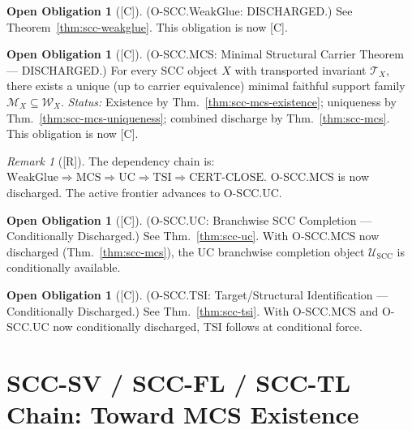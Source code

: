 \documentclass[12pt,oneside]{amsbook}
\theoremstyle{plain}
\theoremstyle{definition}
\newtheorem{obligation}[theorem]{Open Obligation}
\theoremstyle{remark}
\newtheorem{remark}[theorem]{Remark}
\newcommand{\status}[1]{\textup{[#1]}}
\begin{document}
\begin{obligation}[\status{C}]\label{ob:scc-weakglue}
\textup{(O-SCC.WeakGlue: DISCHARGED.)}
See Theorem~\ref{thm:scc-weakglue}. This obligation is now [C].
\end{obligation}

\begin{obligation}[\status{C}]\label{ob:scc-mcs}
\textup{(O-SCC.MCS: Minimal Structural Carrier Theorem --- DISCHARGED.)}
For every SCC object $X$ with transported invariant
$\mathcal{T}_X$, there exists a unique (up to carrier equivalence)
minimal faithful support family $\mathcal{M}_X \subseteq \mathcal{W}_X$.
\emph{Status:} Existence by Thm.~\ref{thm:scc-mcs-existence};
uniqueness by Thm.~\ref{thm:scc-mcs-uniqueness};
combined discharge by Thm.~\ref{thm:scc-mcs}.
This obligation is now [C].
\end{obligation}

\begin{remark}[\status{R}]
The dependency chain is:
$\mathrm{WeakGlue} \Rightarrow \mathrm{MCS} \Rightarrow
\mathrm{UC} \Rightarrow \mathrm{TSI} \Rightarrow \mathrm{CERT\text{-}CLOSE}$.
O-SCC.MCS is now discharged. The active frontier advances to O-SCC.UC.
\end{remark}

\begin{obligation}[\status{C}]\label{ob:scc-uc}
\textup{(O-SCC.UC: Branchwise SCC Completion --- Conditionally Discharged.)}
See Thm.~\ref{thm:scc-uc}. With O-SCC.MCS now discharged
(Thm.~\ref{thm:scc-mcs}), the UC branchwise completion object
$\mathcal{U}_{\mathrm{SCC}}$ is conditionally available.
\end{obligation}

\begin{obligation}[\status{C}]\label{ob:scc-tsi}
\textup{(O-SCC.TSI: Target/Structural Identification --- Conditionally Discharged.)}
See Thm.~\ref{thm:scc-tsi}. With O-SCC.MCS and O-SCC.UC
now conditionally discharged, TSI follows at conditional force.
\end{obligation}

\section{SCC-SV / SCC-FL / SCC-TL Chain: Toward MCS Existence}
\label{sec:scc-fl-chain}
\end{document}
